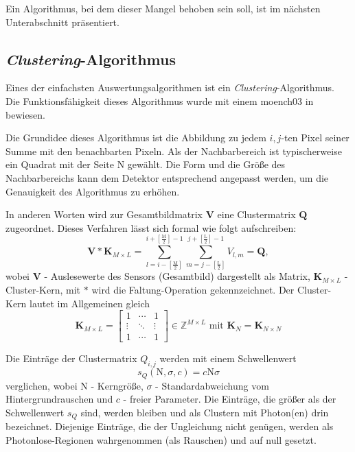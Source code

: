 \noindent
Ein Algorithmus, bei dem dieser Mangel behoben sein soll, ist im nächsten Unterabschnitt präsentiert.

\subsection{\emph{Clustering}-Algorithmus}
\label{text:clustering_algorithm}
Eines der einfachsten Auswertungsalgorithmen ist ein \emph{Clustering}-Algorithmus. Die Funktionsfähigkeit dieses Algorithmus wurde mit einem \gls{moench03} in \cite{cartier_micron_2014} bewiesen.

\noindent
Die Grundidee dieses Algorithmus ist die Abbildung zu jedem $i,j$-ten Pixel seiner Summe mit den benachbarten Pixeln. Als der Nachbarbereich ist typischerweise ein Quadrat mit der Seite N gewählt. Die Form und die Größe des Nachbarbereichs kann dem Detektor entsprechend angepasst werden, um die Genauigkeit des Algorithmus zu erhöhen.

\noindent
In anderen Worten wird zur Gesamtbildmatrix $\mathbf{V}$ eine Clustermatrix $\mathbf{Q}$ zugeordnet. Dieses Verfahren lässt sich formal wie folgt aufschreiben:
\begin{equation}
    \mathbf{V} * \mathbf{K}_{M\times L} = \sum_{l=i-\left[\frac{\text{M}}{2}\right]}^{i+\left[\frac{\text{M}}{2}\right]-1} \sum_{m=j-\left[\frac{\text{L}}{2}\right]}^{j+\left[\frac{\text{L}}{2}\right]-1} V_{l,m} = \mathbf{Q},
\end{equation}
wobei $\mathbf{V}$ - Auslesewerte des Sensors (Gesamtbild) dargestellt als Matrix, $\mathbf{K}_{M \times L}$ - Cluster-Kern, mit $*$ wird die Faltung-Operation gekennzeichnet. Der Cluster-Kern lautet im Allgemeinen gleich
\begin{equation}
    \mathbf{K}_{M \times L}  = \begin{bmatrix}
1 & \cdots & 1\\
\vdots & \ddots & \vdots\\
1 & \cdots & 1
\end{bmatrix}
\in \mathbb{Z}^{M \times L} \text{ mit } \mathbf{K}_N = \mathbf{K}_{N \times N}
\end{equation}

\noindent
Die Einträge der Clustermatrix $Q_{i,j}$ werden mit einem Schwellenwert 
\begin{equation}
    s_Q(\text{N}, \sigma, c) = c\text{N}\sigma
\end{equation}
verglichen, wobei N - Kerngröße, $\sigma$ - Standardabweichung vom Hintergrundrauschen und $c$ - freier Parameter. Die Einträge, die größer als der Schwellenwert $s_Q$ sind, werden bleiben und als Clustern mit Photon(en) drin bezeichnet. Diejenige Einträge, die der Ungleichung nicht genügen, werden als Photonlose-Regionen wahrgenommen (als Rauschen) und auf null gesetzt.

